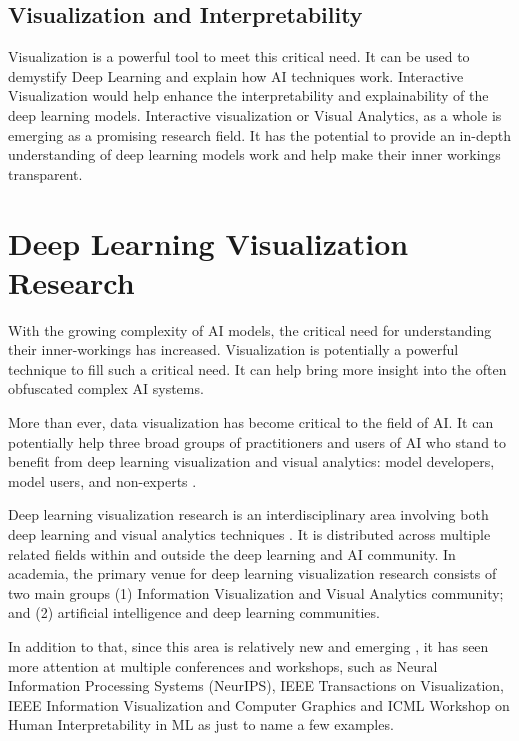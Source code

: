 \subsection{Visualization and Interpretability}

Visualization is a powerful tool to meet this critical need. It can be used to demystify Deep Learning and explain how AI techniques work. Interactive Visualization would help enhance the interpretability and explainability of the deep learning models. Interactive visualization or Visual Analytics, as a whole is emerging as a promising research field. It has the potential to provide an in-depth understanding of deep learning models work and help make their inner workings transparent.

\section{Deep Learning Visualization Research}

With the growing complexity of AI models, the critical need for understanding their inner-workings has increased. Visualization is potentially a powerful technique to fill such a critical need. It can help bring more insight into the often obfuscated complex AI systems.

More than ever, data visualization has become critical to the field of AI. It can potentially help three broad groups of practitioners and users of AI who stand to benefit from deep learning visualization and visual analytics: model developers, model users, and non-experts \cite{Choo2018}.

Deep learning visualization research is an interdisciplinary area involving both deep learning and visual analytics techniques \cite{Choo2018}. It is distributed across multiple related fields within and outside the deep learning and AI community. In academia, the primary venue for deep learning visualization research consists of two main groups (1) Information Visualization and Visual Analytics community; and (2) artificial intelligence and deep learning communities. 

In addition to that, since this area is relatively new and emerging \cite{Choo2018}, it has seen more attention at multiple conferences and workshops, such as Neural Information Processing Systems (NeurIPS), IEEE Transactions on Visualization, IEEE Information Visualization and Computer Graphics and ICML Workshop on Human Interpretability in ML as just to name a few examples.

